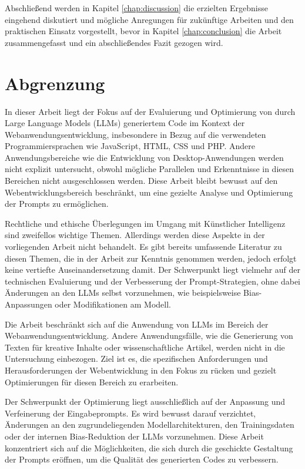 Abschließend werden in Kapitel \ref{chap:discussion} die erzielten Ergebnisse eingehend diskutiert und mögliche Anregungen für zukünftige Arbeiten und den praktischen Einsatz vorgestellt, bevor in Kapitel \ref{chap:conclusion} die Arbeit zusammengefasst und ein abschließendes Fazit gezogen wird.



\section{Abgrenzung}
In dieser Arbeit liegt der Fokus auf der Evaluierung und Optimierung von durch Large Language Models (LLMs) generiertem Code im Kontext der Webanwendungsentwicklung, insbesondere in Bezug auf die verwendeten Programmiersprachen wie JavaScript, HTML, CSS und PHP. Andere Anwendungsbereiche wie die Entwicklung von Desktop-Anwendungen werden nicht explizit untersucht, obwohl mögliche Parallelen und Erkenntnisse in diesen Bereichen nicht ausgeschlossen werden. Diese Arbeit bleibt bewusst auf den Webentwicklungsbereich beschränkt, um eine gezielte Analyse und Optimierung der Prompts zu ermöglichen.\vspace{0.2cm}

Rechtliche und ethische Überlegungen im Umgang mit Künstlicher Intelligenz sind zweifellos wichtige Themen. Allerdings werden diese Aspekte in der vorliegenden Arbeit nicht behandelt. Es gibt bereits umfassende Literatur zu diesen Themen, die in der Arbeit zur Kenntnis genommen werden, jedoch erfolgt keine vertiefte Auseinandersetzung damit. Der Schwerpunkt liegt vielmehr auf der technischen Evaluierung und der Verbesserung der Prompt-Strategien, ohne dabei Änderungen an den LLMs selbst vorzunehmen, wie beispielsweise Bias-Anpassungen oder Modifikationen am Modell.\vspace{0.2cm}

Die Arbeit beschränkt sich auf die Anwendung von LLMs im Bereich der Webanwendungsentwicklung. Andere Anwendungsfälle, wie die Generierung von Texten für kreative Inhalte oder wissenschaftliche Artikel, werden nicht in die Untersuchung einbezogen. Ziel ist es, die spezifischen Anforderungen und Herausforderungen der Webentwicklung in den Fokus zu rücken und gezielt Optimierungen für diesen Bereich zu erarbeiten.\vspace{0.2cm}

Der Schwerpunkt der Optimierung liegt ausschließlich auf der Anpassung und Verfeinerung der Eingabeprompts. Es wird bewusst darauf verzichtet, Änderungen an den zugrundeliegenden Modellarchitekturen, den Trainingsdaten oder der internen Bias-Reduktion der LLMs vorzunehmen. Diese Arbeit konzentriert sich auf die Möglichkeiten, die sich durch die geschickte Gestaltung der Prompts eröffnen, um die Qualität des generierten Codes zu verbessern.\vspace{0.2cm}

